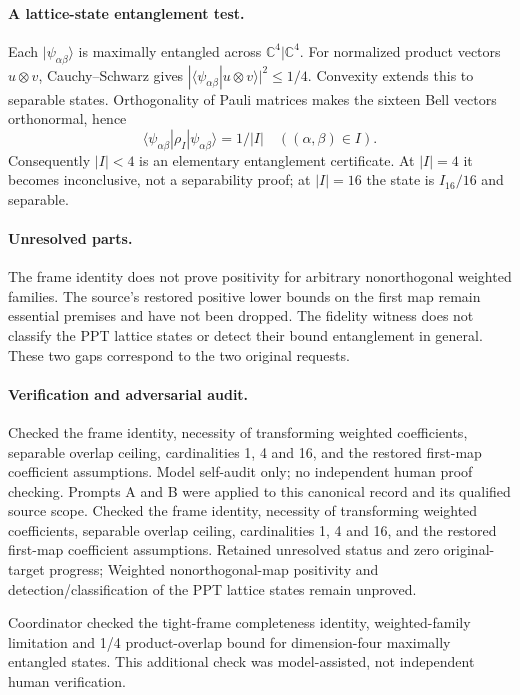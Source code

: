 \documentclass[11pt]{article}
\begin{document}
\paragraph{A lattice-state entanglement test.} Each $|\psi_{\alpha\beta}\rangle$ is maximally entangled across $\mathbb C^4|\mathbb C^4$. For normalized product vectors $u\otimes v$, Cauchy--Schwarz gives $|\langle\psi_{\alpha\beta}|u\otimes v\rangle|^2\leq1/4$. Convexity extends this to separable states. Orthogonality of Pauli matrices makes the sixteen Bell vectors orthonormal, hence
\[
 \langle\psi_{\alpha\beta}|\rho_I|\psi_{\alpha\beta}\rangle=1/|I|\quad((\alpha,\beta)\in I).
\]
Consequently $|I|<4$ is an elementary entanglement certificate. At $|I|=4$ it becomes inconclusive, not a separability proof; at $|I|=16$ the state is $I_{16}/16$ and separable.

\paragraph{Unresolved parts.} The frame identity does not prove positivity for arbitrary nonorthogonal weighted families. The source's restored positive lower bounds on the first map remain essential premises and have not been dropped. The fidelity witness does not classify the PPT lattice states or detect their bound entanglement in general. These two gaps correspond to the two original requests.

\paragraph{Verification and adversarial audit.}
Checked the frame identity, necessity of transforming weighted coefficients, separable overlap ceiling, cardinalities 1, 4 and 16, and the restored first-map coefficient assumptions. Model self-audit only; no independent human proof checking. Prompts A and B were applied to this canonical record and its qualified source scope. Checked the frame identity, necessity of transforming weighted coefficients, separable overlap ceiling, cardinalities 1, 4 and 16, and the restored first-map coefficient assumptions. Retained unresolved status and zero original-target progress; Weighted nonorthogonal-map positivity and detection/classification of the PPT lattice states remain unproved.

Coordinator checked the tight-frame completeness identity, weighted-family limitation and 1/4 product-overlap bound for dimension-four maximally entangled states. This additional check was model-assisted, not independent human verification.
\end{document}
